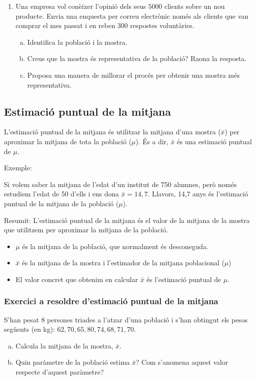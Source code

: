 \begin{enumerate}
 \item Una empresa vol conèixer l'opinió dels seus $5000$ clients sobre un nou producte. Envia una enquesta per correu electrònic només als clients que van comprar el mes passat i en reben $300$ respostes voluntàries.
 \begin{enumerate}[a)]
  \item Identifica la població i la mostra.
  \item Creus que la mostra és representativa de la població? Raona la resposta.
  \item Proposa una manera de millorar el procés per obtenir una mostra més representativa.
 \end{enumerate}
\end{enumerate}


\subsection{Estimació puntual de la mitjana}
L'estimació puntual de la mitjana és utilitzar la mitjana d'una mostra ($\bar{x}$) per aproximar la mitjana de tota la població ($\mu$). És a dir, $\bar{x}$ és una estimació puntual de $\mu$.

Exemple:

Si volem saber la mitjana de l'edat d'un institut de 750 alumnes, però només estudiem l'edat de 50 d'ells i ens dona $\bar{x} = 14,7$. Llavors, 14,7 anys és l'estimació puntual de la mitjana de la població ($\mu$).

Resumit:
L'estimació puntual de la mitjana és el valor de la mitjana de la mostra que utilitzem per aproximar la mitjana de la població.

\begin{itemize}
\item $\mu$ és la mitjana de la població, que normalment és desconeguda.
\item $\bar{x}$ és la mitjana de la mostra i l'estimador de la mitjana poblacional ($\mu$)
\item El valor concret que obtenim en calcular $\bar{x}$ és l'estimació puntual de $\mu$.
\end{itemize}

\subsubsection{Exercici a resoldre d'estimació puntual de la mitjana}
S'han pesat $8$ persones triades a l'atzar d'una població i s'han obtingut els pesos següents (en kg): $62, 70, 65, 80, 74, 68, 71, 70$.
 \begin{enumerate}[a)]
  \item Calcula la mitjana de la mostra, $\bar{x}$.
  \item Quin paràmetre de la població estima $\bar{x}$? Com s'anomena aquest valor respecte d'aquest paràmetre?
 \end{enumerate}

